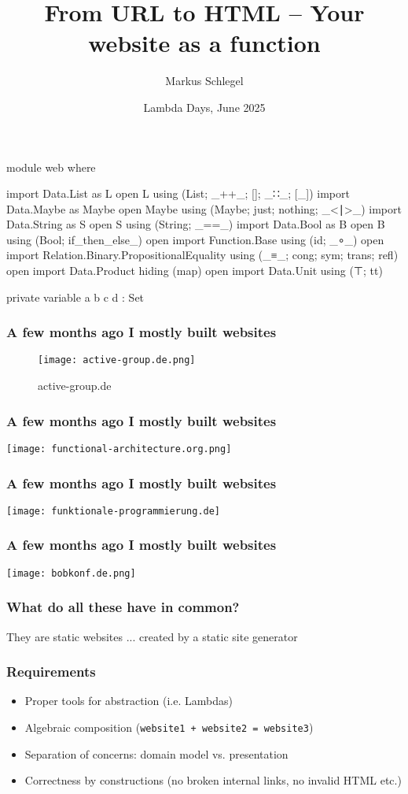\documentclass[aspectratio=169]{beamer}
\title{From URL to HTML -- Your website as a function}
\author{Markus Schlegel}
\institute{Active Group GmbH}
\date{Lambda Days, June 2025}
\begin{document}
\frame{\titlepage}

\begin{frame}
\begin{code}
module web where

import Data.List as L
open L using (List; _++_; []; _∷_; [_])
import Data.Maybe as Maybe
open Maybe using (Maybe; just; nothing; _<∣>_)
import Data.String as S
open S using (String; _==_)
import Data.Bool as B
open B using (Bool; if_then_else_)
open import Function.Base using (id; _∘_)
open import Relation.Binary.PropositionalEquality
  using (_≡_; cong; sym; trans; refl)
open import Data.Product hiding (map)
open import Data.Unit using (⊤; tt)
\end{code}
\end{frame}

\begin{frame}
\begin{code}
private
  variable
    a b c d : Set
\end{code}
\end{frame}

\begin{frame}
\frametitle{A few months ago I mostly built websites}
\begin{figure}
\centering
    \texttt{[image: active-group.de.png]}
    \caption{active-group.de}
\end{figure}
\end{frame}

\begin{frame}
\frametitle{A few months ago I mostly built websites}
\texttt{[image: functional-architecture.org.png]}
\end{frame}

\begin{frame}
\frametitle{A few months ago I mostly built websites}
\texttt{[image: funktionale-programmierung.de]}
\end{frame}

\begin{frame}
\frametitle{A few months ago I mostly built websites}
\texttt{[image: bobkonf.de.png]}
\end{frame}

\begin{frame}
\frametitle{What do all these have in common?}
They are static websites ... created by a static site generator
\end{frame}

\begin{frame}
\frametitle{Requirements}
\begin{itemize}
  \item Proper tools for abstraction (i.e. Lambdas)
  \item Algebraic composition (\texttt{website1 + website2 = website3})
  \item Separation of concerns: domain model vs. presentation
  \item Correctness by constructions (no broken internal links, no invalid HTML etc.)
\end{itemize}
\end{frame}
\end{document}
